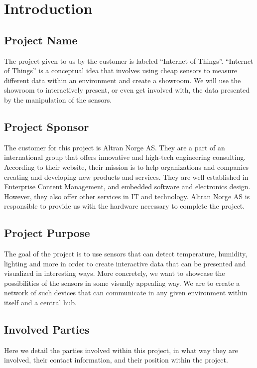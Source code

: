 ﻿\documentclass[../document.tex]{subfiles}
\begin{document}
\section*{Introduction}

\subsection*{Project Name}
The project given to us by the customer is labeled “Internet of Things”. “Internet of Things” is a conceptual idea that involves using cheap sensors to measure different data within an environment and create a showroom. We will use the showroom to interactively present, or even get involved with, the data presented by the manipulation of the sensors.

\subsection*{Project Sponsor}
The customer for this project is Altran Norge AS. They are a part of an international group that offers innovative and high-tech engineering consulting. According to their website, their mission is to help organizations and companies creating and developing new products and services. They are well established in Enterprise Content Management, and embedded software and electronics design. However, they also offer other services in IT and technology. Altran Norge AS is responsible to provide us with the hardware necessary to complete the project.

\subsection*{Project Purpose}
The goal of the project is to use sensors that can detect temperature, humidity, lighting and more in order to create interactive data that can be presented and visualized in interesting ways. More concretely, we want to showcase the possibilities of the sensors in some visually appealing way. We are to create a network of such devices that can communicate in any given environment within itself and a central hub.

\subsection*{Involved Parties}
Here we detail the parties involved within this project, in what way they are involved, their contact information, and their position within the project.
\end{document}
